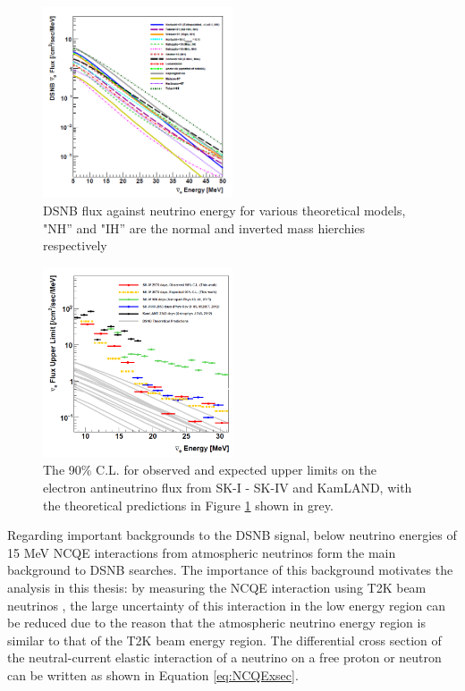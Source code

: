 \begin{figure}
    \centering
    \includegraphics[width=0.5\textwidth]{Figures/DSNB_energy.png}
    \caption{DSNB flux against neutrino energy for various theoretical models, "NH'' and "IH'' are the normal and inverted mass hierchies respectively}
    \label{fig:DSNBenergy}
\end{figure}

\begin{figure}
    \centering
    \includegraphics[width=0.5\textwidth]{Figures/DSNBlimit.png}
    \caption{The 90\% C.L. for observed and expected upper limits on the electron antineutrino flux from SK-I - SK-IV and KamLAND, with the theoretical predictions in Figure \ref{fig:DSNBenergy} shown in grey.}
    \label{fig:DSNBlimit}
\end{figure}


Regarding important backgrounds to the DSNB signal, below neutrino energies of 15 MeV NCQE interactions from atmospheric neutrinos form the main background to DSNB searches. The importance of this background motivates the analysis in this thesis: by measuring the NCQE interaction using T2K beam neutrinos \cite{abe2021diffuse}, the large uncertainty of this interaction in the low energy region can be reduced due to the reason that the atmospheric neutrino energy region is similar to that of the T2K beam energy region. The differential cross section of the neutral-current elastic interaction of a neutrino on a free proton or neutron can be written as shown in Equation \ref{eq:NCQExsec}. 

